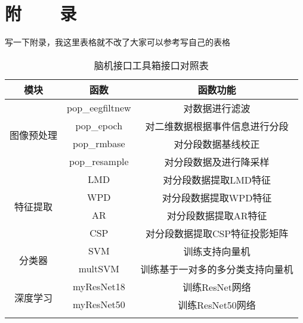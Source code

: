 
\renewcommand{\baselinestretch}{1.345}
\fontsize{12pt}{14.4pt}\selectfont
{}
\chapter*{附~~~~录}

写一下附录，我这里表格就不改了大家可以参考写自己的表格
\begin{table}[!ht]
	\centering
	\caption{脑机接口工具箱接口对照表}\label{label2}
	\setlength{\tabcolsep}{5mm}
	{
		\begin{tabular}{|c|c|c|}
			\hline
			模块                     & 函数              & 函数功能                                                      \\ \hline
			\multirow{4}{*}{图像预处理} & pop\_eegfiltnew & 对数据进行滤波                                                   \\ \cline{2-3} 
			& pop\_epoch      & 对二维数据根据事件信息进行分段                                           \\ \cline{2-3} 
			& pop\_rmbase     & 对分段数据基线校正                                                 \\ \cline{2-3} 
			& pop\_resample   & 对分段数据及进行降采样                                               \\ \hline
			\multirow{4}{*}{特征提取}  & LMD             & 对分段数据提取LMD特征                                              \\ \cline{2-3} 
			& WPD             & 对分段数据提取WPD特征                                              \\ \cline{2-3} 
			& AR              & 对分段数据提取AR特征                                               \\ \cline{2-3} 
			& CSP             & 对分段数据提取CSP特征投影矩阵                                          \\ \hline
			\multirow{2}{*}{分类器}   & SVM             & 训练支持向量机 \\ \cline{2-3} 
			& multSVM         & 训练基于一对多的多分类支持向量机                          \\ \hline
			\multirow{7}{*}{深度学习}  & myResNet18      & 训练ResNet网络                                                \\ \cline{2-3} 
			& myResNet50      & 训练ResNet50网络                                              \\ \cline{2-3} 

\end{tabular}}
\end{table}
